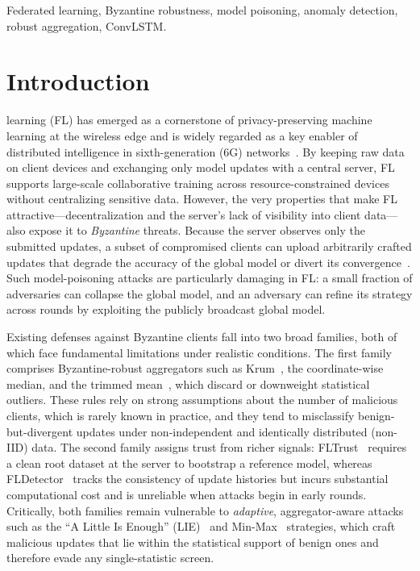 \documentclass[journal]{IEEEtran}
\begin{document}
\begin{IEEEkeywords}
Federated learning, Byzantine robustness, model poisoning, anomaly detection, robust aggregation, ConvLSTM.
\end{IEEEkeywords}

\section{Introduction}
\label{sec:introduction}


 learning (FL) has emerged as a cornerstone of privacy-preserving machine learning at the wireless edge and is widely regarded as a key enabler of distributed intelligence in sixth-generation (6G) networks~\cite{sandeepa2025federated}. By keeping raw data on client devices and exchanging only model updates with a central server, FL supports large-scale collaborative training across resource-constrained devices without centralizing sensitive data. However, the very properties that make FL attractive---decentralization and the server's lack of visibility into client data---also expose it to \emph{Byzantine} threats. Because the server observes only the submitted updates, a subset of compromised clients can upload arbitrarily crafted updates that degrade the accuracy of the global model or divert its convergence~\cite{baruch2019little, fang2020local, shejwalkar2021manipulating}. Such model-poisoning attacks are particularly damaging in FL: a small fraction of adversaries can collapse the global model, and an adversary can refine its strategy across rounds by exploiting the publicly broadcast global model.

Existing defenses against Byzantine clients fall into two broad families, both of which face fundamental limitations under realistic conditions. The first family comprises Byzantine-robust aggregators such as Krum~\cite{blanchard2017machine}, the coordinate-wise median, and the trimmed mean~\cite{yin2018byzantine}, which discard or downweight statistical outliers. These rules rely on strong assumptions about the number of malicious clients, which is rarely known in practice, and they tend to misclassify benign-but-divergent updates under non-independent and identically distributed (non-IID) data. The second family assigns trust from richer signals: FLTrust~\cite{cao2020fltrust} requires a clean root dataset at the server to bootstrap a reference model, whereas FLDetector~\cite{zhang2022fldetector} tracks the consistency of update histories but incurs substantial computational cost and is unreliable when attacks begin in early rounds. Critically, both families remain vulnerable to \emph{adaptive}, aggregator-aware attacks such as the ``A Little Is Enough'' (LIE)~\cite{baruch2019little} and Min-Max~\cite{shejwalkar2021manipulating} strategies, which craft malicious updates that lie within the statistical support of benign ones and therefore evade any single-statistic screen.
\end{document}
